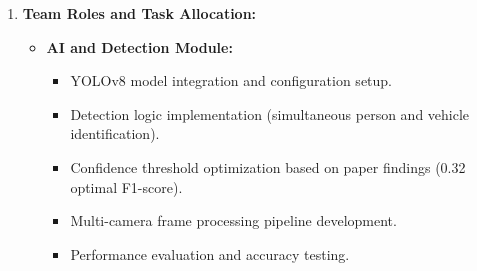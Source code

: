 \documentclass[a4paper, 12pt]{report}
\begin{document}
\begin{enumerate}[itemsep=-4pt, label=\textbf{\roman*.}]
\begin{itemize}
        \item \textbf{Hardware Components:}
        \vspace{-4pt}
        \begin{itemize}[itemsep=-4pt]
        \item \textbf{Camera Modules:} Two USB webcams/cameras for dual-angle coverage.
        \item \textbf{Microcontroller:} ESP32 DevKit (30-pin) for alert control and WiFi communication.

        \item \textbf{Alert Hardware:} Siren/buzzer, 220Ω resistor, relay module.
        \end{itemize}

        \item \textbf{Core Libraries:}
        \vspace{-4pt}
        \begin{itemize}[itemsep=-4pt]
        \item OpenCV (cv2) for camera capture and image processing.
        \item Ultralytics for YOLOv8 model operations.
        \item Requests for HTTP communication.
        \item PyYAML for configuration management.
        \item Pandas for CSV logging.
        \item NumPy for numerical operation.
        \end{itemize}
    \end{itemize}
    

    \item \textbf{Team Roles and Task Allocation: }
    \vspace{-4pt}
    \begin{itemize}[itemsep=-4pt]
        \item \textbf{AI and Detection Module:}
        \vspace{-4pt}
        \begin{itemize}[itemsep=-4pt]
        \item YOLOv8 model integration and configuration setup.
        \item Detection logic implementation (simultaneous person and vehicle identification).
        \item Confidence threshold optimization based on paper findings (0.32 optimal F1-score).
        \item Multi-camera frame processing pipeline development.
        \item Performance evaluation and accuracy testing.
        \end{itemize}


\end{itemize}
\end{enumerate}
\end{document}
